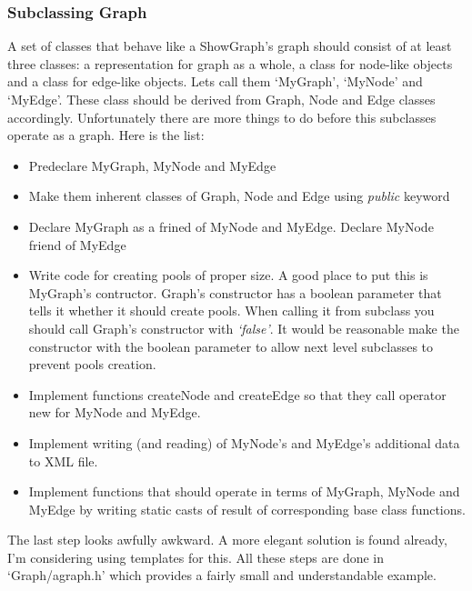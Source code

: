 \documentclass[11pt,a4paper]{article}
\begin{document}
\subsubsection{Subclassing Graph}
A set of classes that behave like a ShowGraph's graph should consist of at least three classes: a representation for graph as a whole, a class for node-like objects and a class for edge-like objects. Lets call them `MyGraph', `MyNode' and `MyEdge'. These class should be derived from Graph, Node and Edge classes accordingly. Unfortunately there are more things to do before this subclasses operate as a graph. Here is the list:
\begin{itemize}
\item Predeclare MyGraph, MyNode and MyEdge
\item Make them inherent classes of Graph, Node and Edge using \emph{public} keyword
\item Declare MyGraph as a frined of MyNode and MyEdge. Declare MyNode friend of MyEdge
\item Write code for creating pools of proper size. A good place to put this is MyGraph's contructor. Graph's constructor has a boolean parameter that tells it whether it should create pools. When calling it from subclass you should call Graph's constructor with \emph{`false'}. It would be reasonable make the constructor with the boolean parameter to allow next level subclasses to prevent pools creation.
\item Implement functions createNode and createEdge so that they call operator new for MyNode and MyEdge.
\item Implement writing (and reading) of MyNode's and MyEdge's additional data to XML file.
\item Implement functions that should operate in terms of MyGraph, MyNode and MyEdge by writing static casts of result of corresponding base class functions.
\end{itemize}

The last step looks awfully awkward. A more elegant solution is found already, I'm considering using templates for this. All these steps are done in `Graph/agraph.h' which provides a fairly small and understandable  example.
\end{document}
